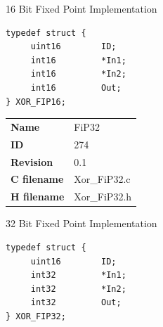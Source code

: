 16 Bit Fixed Point Implementation

\begin{lstlisting}
typedef struct {
     uint16        ID;
     int16         *In1;
     int16         *In2;
     int16         Out;
} XOR_FIP16;
\end{lstlisting}

\ifdefined \AddTestReports
{}
\fi
{}
\nopagebreak[0]
\begin{tabular}{l l}
\textbf{Name} & FiP32 \tabularnewline
\textbf{ID} & 274 \tabularnewline
\textbf{Revision} & 0.1 \tabularnewline
\textbf{C filename} & Xor\_FiP32.c \tabularnewline
\textbf{H filename} & Xor\_FiP32.h \tabularnewline
\end{tabular}
\vspace{1ex}

32 Bit Fixed Point Implementation

\begin{lstlisting}
typedef struct {
     uint16        ID;
     int32         *In1;
     int32         *In2;
     int32         Out;
} XOR_FIP32;
\end{lstlisting}

\ifdefined \AddTestReports
{}
\fi
